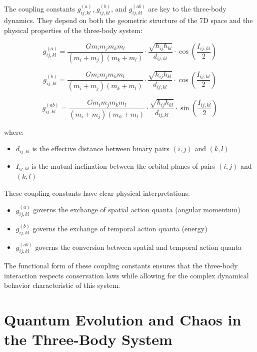 \documentclass{article}
\begin{document}
The coupling constants $g_{ij,kl}^{(a)}$, $g_{ij,kl}^{(b)}$, and $g_{ij,kl}^{(ab)}$ are key to the three-body dynamics. They depend on both the geometric structure of the 7D space and the physical properties of the three-body system:

\begin{equation}
g_{ij,kl}^{(a)} = \frac{G m_i m_j m_k m_l}{(m_i+m_j)(m_k+m_l)} \cdot \frac{\sqrt{\hbar_{ij}\hbar_{kl}}}{d_{ij,kl}} \cdot \cos\left(\frac{I_{ij,kl}}{2}\right)
\end{equation}

\begin{equation}
g_{ij,kl}^{(b)} = \frac{G m_i m_j m_k m_l}{(m_i+m_j)(m_k+m_l)} \cdot \frac{\sqrt{h_{ij}h_{kl}}}{d_{ij,kl}} \cdot \cos\left(\frac{I_{ij,kl}}{2}\right)
\end{equation}

\begin{equation}
g_{ij,kl}^{(ab)} = \frac{G m_i m_j m_k m_l}{(m_i+m_j)(m_k+m_l)} \cdot \frac{\sqrt{\hbar_{ij}h_{kl}}}{d_{ij,kl}} \cdot \sin\left(\frac{I_{ij,kl}}{2}\right)
\end{equation}

where:
\begin{itemize}
\item $d_{ij,kl}$ is the effective distance between binary pairs $(i,j)$ and $(k,l)$
\item $I_{ij,kl}$ is the mutual inclination between the orbital planes of pairs $(i,j)$ and $(k,l)$
\end{itemize}

These coupling constants have clear physical interpretations:
\begin{itemize}
\item $g_{ij,kl}^{(a)}$ governs the exchange of spatial action quanta (angular momentum)
\item $g_{ij,kl}^{(b)}$ governs the exchange of temporal action quanta (energy)
\item $g_{ij,kl}^{(ab)}$ governs the conversion between spatial and temporal action quanta
\end{itemize}

The functional form of these coupling constants ensures that the three-body interaction respects conservation laws while allowing for the complex dynamical behavior characteristic of this system.

\section{Quantum Evolution and Chaos in the Three-Body System}
\end{document}
